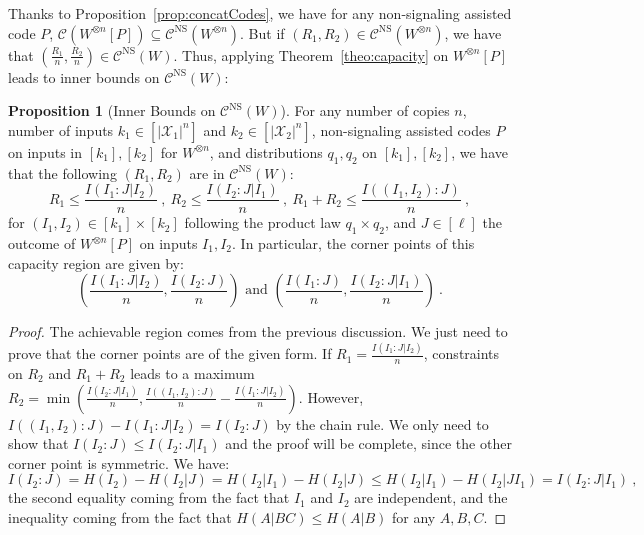 \documentclass[11pt]{article}
\theoremstyle{definition}
\newtheorem{prop}[theo]{Proposition}
\theoremstyle{remark}
\begin{document}
  
  Thanks to Proposition~\ref{prop:concatCodes}, we have for any non-signaling assisted code $P$, $\mathcal{C}(W^{\otimes n}[P]) \subseteq \mathcal{C}^{\mathrm{NS}}(W^{\otimes n})$. But if $(R_1,R_2) \in \mathcal{C}^{\mathrm{NS}}(W^{\otimes n})$, we have that $(\frac{R_1}{n},\frac{R_2}{n}) \in \mathcal{C}^{\mathrm{NS}}(W)$. Thus, applying Theorem~\ref{theo:capacity} on $W^{\otimes n}[P]$ leads to inner bounds on $\mathcal{C}^{\mathrm{NS}}(W)$:
  \begin{prop}[Inner Bounds on $\mathcal{C}^{\mathrm{NS}}(W)$]
    \label{prop:NumericalMethod} For any number of copies $n$, number of inputs $k_1 \in [|\mathcal{X}_1|^n]$ and $k_2 \in [|\mathcal{X}_2|^n]$, non-signaling assisted codes $P$ on inputs in $[k_1],[k_2]$ for $W^{\otimes n}$, and distributions $q_1,q_2$ on $[k_1],[k_2]$, we have that the following $(R_1,R_2)$ are in $\mathcal{C}^{\mathrm{NS}}(W)$: 
  \[ R_1 \leq \frac{I(I_1:J|I_2)}{n}\ ,\ R_2 \leq \frac{I(I_2:J|I_1)}{n}\ ,\ R_1+R_2 \leq \frac{I((I_1,I_2):J)}{n} \ ,\]
  for $(I_1,I_2) \in [k_1] \times [k_2]$ following the product law $q_1 \times q_2$, and $J \in [\ell]$ the outcome of $W^{\otimes n }[P]$ on inputs $I_1,I_2$. In particular, the corner points of this capacity region are given by:
  \[ \left(\frac{I(I_1:J|I_2)}{n},\frac{I(I_2 : J)}{n} \right) \text{ and } \left(\frac{I(I_1 : J)}{n} ,\frac{I(I_2:J|I_1)}{n}\right) \ .\]
  \end{prop}

  \begin{proof}
    The achievable region comes from the previous discussion. We just need to prove that the corner points are of the given form. If $R_1=\frac{I(I_1:J|I_2)}{n}$, constraints on $R_2$ and $R_1+R_2$ leads to a maximum $R_2 = \min\left(\frac{I(I_2:J|I_1)}{n}, \frac{I((I_1,I_2):J)}{n}-\frac{I(I_1:J|I_2)}{n}\right)$. However, $I((I_1,I_2):J)-I(I_1:J|I_2)=I(I_2 : J)$ by the chain rule. We only need to show that $I(I_2:J) \leq I(I_2:J|I_1)$ and the proof will be complete, since the other corner point is symmetric. We have:
    \[ I(I_2:J) = H(I_2)-H(I_2|J) = H(I_2|I_1) - H(I_2|J) \leq H(I_2|I_1) - H(I_2|JI_1) = I(I_2:J|I_1) \ ,\]
    the second equality coming from the fact that $I_1$ and $I_2$ are independent, and the inequality coming from the fact that $H(A|BC) \leq H(A|B)$ for any $A,B,C$.
  \end{proof}
  
\end{document}
